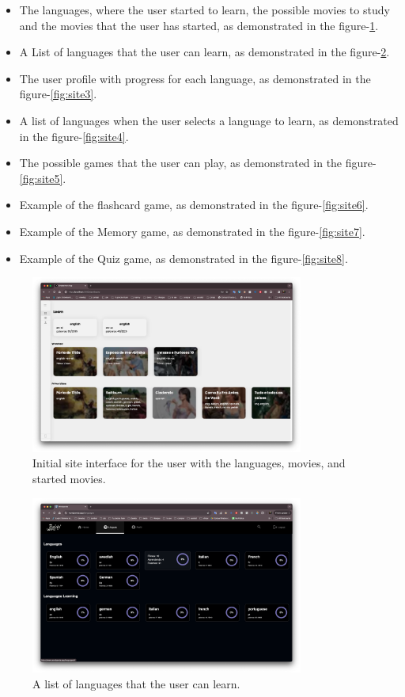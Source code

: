 \documentclass[12pt]{article}
\begin{document}
\begin{itemize}
\item The languages, where the user started to learn, the possible movies to study and the movies that the user has started, as demonstrated in the figure-\ref{fig:site1}.
\item A List of languages that the user can learn, as demonstrated in the figure-\ref{fig:site2}.
\item The user profile with progress for each language, as demonstrated in the figure-\ref{fig:site3}.
\item A list of languages when the user selects a language to learn, as demonstrated in the figure-\ref{fig:site4}.
\item The possible games that the user can play, as demonstrated in the figure-\ref{fig:site5}.
\item Example of the flashcard game, as demonstrated in the figure-\ref{fig:site6}.
\item Example of the Memory game, as demonstrated in the figure-\ref{fig:site7}.
\item Example of the Quiz game, as demonstrated in the figure-\ref{fig:site8}.
\end{itemize}






  \begin{figure}
   \centering
   \caption{
   Initial site interface for the user with the languages, movies, and started movies.
    }
   \label{fig:site1}
   \includegraphics[width=0.8\textwidth]{assets/20.png}
  \end{figure}

  \begin{figure}
    \centering
    \caption{
    A list of languages that the user can learn. 
    }
    \label{fig:site2}
    \includegraphics[width=0.8\textwidth]{assets/21.png}
  \end{figure}
\end{document}
